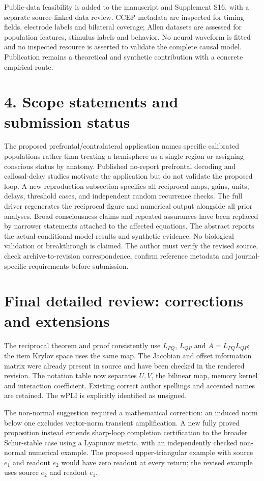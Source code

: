 \documentclass[11pt,a4paper]{article}
\begin{document}
Public-data feasibility is added to the manuscript and Supplement S16, with a separate source-linked data review. CCEP metadata are inspected for timing fields, electrode labels and bilateral coverage; Allen datasets are assessed for population features, stimulus labels and behavior. No neural waveform is fitted and no inspected resource is asserted to validate the complete causal model. Publication remains a theoretical and synthetic contribution with a concrete empirical route.

\section*{4. Scope statements and submission status}
The proposed prefrontal/contralateral application names specific calibrated populations rather than treating a hemisphere as a single region or assigning conscious status by anatomy. Published no-report prefrontal decoding and callosal-delay studies motivate the application but do not validate the proposed loop. A new reproduction subsection specifies all reciprocal maps, gains, units, delays, threshold cases, and independent random recurrence checks. The full driver regenerates the reciprocal figure and numerical output alongside all prior analyses.
Broad consciousness claims and repeated assurances have been replaced by narrower statements attached to the affected equations. The abstract reports the actual conditional model results and synthetic evidence. No biological validation or breakthrough is claimed. The author must verify the revised source, check archive-to-revision correspondence, confirm reference metadata and journal-specific requirements before submission.
\section*{Final detailed review: corrections and extensions}
The reciprocal theorem and proof consistently use $L_{PQ}$, $L_{QP}$ and $A=L_{PQ}L_{QP}$; the item Krylov space uses the same map. The Jacobian and offset information matrix were already present in source and have been checked in the rendered revision. The notation table now separates $U,V$, the bilinear map, memory kernel and interaction coefficient. Existing correct author spellings and accented names are retained. The wPLI is explicitly identified as unsigned.

The non-normal suggestion required a mathematical correction: an induced norm below one excludes vector-norm transient amplification. A new fully proved proposition instead extends sharp-loop completion certification to the broader Schur-stable case using a Lyapunov metric, with an independently checked non-normal numerical example. The proposed upper-triangular example with source $e_1$ and readout $e_2$ would have zero readout at every return; the revised example uses source $e_2$ and readout $e_1$.
\end{document}
